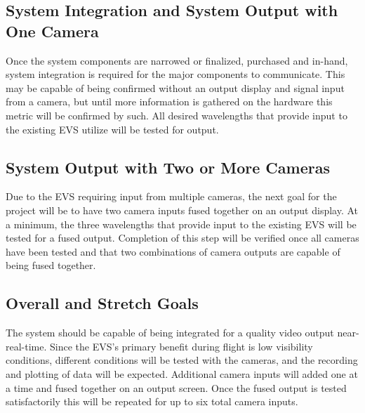 \documentclass[letterpaper,10pt,serif,draftclsnofoot,onecolumn,compsoc,titlepage]{IEEEtran}
\begin{document}
\subsection{System Integration and System Output with One Camera}

Once the system components are narrowed or finalized, purchased and in-hand, system 
integration is required for the major components to communicate. This may be capable 
of being confirmed without an output display and signal input from a camera, but until 
more information is gathered on the hardware this metric will be confirmed by such. All 
desired wavelengths that provide input to the existing EVS utilize will be tested for 
output.\\

\subsection{System Output with Two or More Cameras}

Due to the EVS requiring input from multiple cameras, the next goal for the project 
will be to have two camera inputs fused together on an output display. At a minimum, 
the three wavelengths that provide input to the existing EVS will be tested for a fused 
output. Completion of this step will be verified once all cameras have been tested
and that two combinations of camera outputs are capable of being fused together.\\

\subsection{Overall and Stretch Goals}

The system should be capable of being integrated for a quality video output 
near-real-time. Since the EVS's primary benefit during flight is low visibility 
conditions, different conditions will be tested with the cameras, and the recording 
and plotting of data will be expected. Additional camera inputs will added one at a 
time and fused together on an output screen. Once the fused output is tested 
satisfactorily this will be repeated for up to six total camera inputs.
\\
\end{document}
